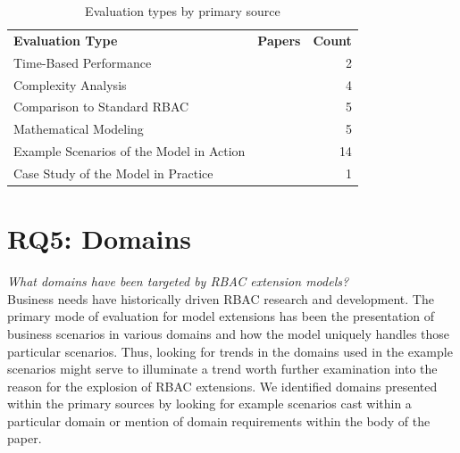 \begin{table}
\centering
\caption{Evaluation types by primary source}
\vspace{0.1 in}
\begin{tabular*}{.9\linewidth}{| p{.45\linewidth} | p{.3\linewidth} | r | }
\cline{1-3}

\textbf{Evaluation Type} & \textbf{Papers} & \textbf{Count} \\ \cline{1-3}
Time-Based Performance
&
\cite{ni2010privacy}
\cite{aich09:role}
&
2 \\ \cline{1-3}
Complexity Analysis
&
\cite{bao08:role}
\cite{zhang06:collaborative}
\cite{chen08:spatio-temporal}
\cite{aich09:role}
&
4 \\ \cline{1-3}
Comparison to Standard RBAC
& 
\cite{bao08:role}
\cite{zou2009crbac}
\cite{zhang06:collaborative}
\cite{zhao2008flexible}
\cite{ray07:spatio}
&
5 \\ \cline{1-3}
Mathematical Modeling
& 
\cite{damiani2007geo}
\cite{hansen2003spatial}
\cite{aich07:STARBAC}
\cite{chen08:spatio-temporal}
\cite{joshi05:generalized}
&
5 \\ \cline{1-3}
Example Scenarios of the Model in Action
& 
\cite{alam06:constraint}
\cite{tzelepi01:flexible}
\cite{cholewka00:acontext-sensitive}
\cite{huang06:pervasive}
\cite{bao08:role}
\cite{jian2008extended}
\cite{yamazaki04:designing}
\cite{zou2009crbac}
\cite{ray07:spatio}
\cite{samuel07:spatio-temporal}
\cite{joshi05:generalized}
\cite{yao2008task}
\cite{zhou2007team}
\cite{oh2003task}
&
14 \\ \cline{1-3}
Case Study of the Model in Practice
&
\cite{motta03:contextual}
&
1 \\ \cline{1-3}

\end{tabular*}
\label{tab:evaluations}
\end{table}


\section{RQ5: Domains} \label{sec:domains}

\textit{What domains have been targeted by RBAC extension models?}
\\

Business needs have historically driven RBAC research and development.  The primary mode of evaluation for
model extensions has been the presentation of business scenarios in various domains and how the model
uniquely handles those particular scenarios.  Thus, looking for trends in the domains used in the example
scenarios might serve to illuminate a trend worth further examination into the reason for the explosion of
RBAC extensions.  We identified domains presented within the primary sources by looking for example
scenarios cast within a particular domain or mention of domain requirements within the body of the paper.

